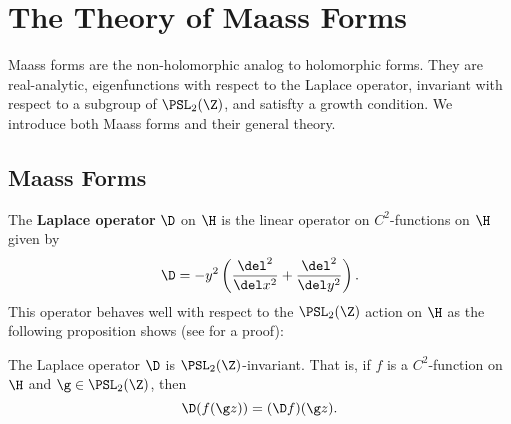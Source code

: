 \chapter{The Theory of Maass Forms}
	Maass forms are the non-holomorphic analog to holomorphic forms. They are real-analytic, eigenfunctions with respect to the Laplace operator, invariant with respect to a subgroup of $\PSL_{2}(\Z)$, and satisfty a growth condition. We introduce both Maass forms and their general theory.
  \section{Maass Forms}
    The \textbf{Laplace operator} $\D$ on $\H$ is the linear operator on $C^{2}$-functions on $\H$ given by
    \[
      \D = -y^{2}\left(\frac{\del^{2}}{\del x^{2}}+\frac{\del^{2}}{\del y^{2}}\right).
    \]
    This operator behaves well with respect to the $\PSL_{2}(\Z)$ action on $\H$ as the following proposition shows (see \cite{motohashi1997spectral} for a proof):

    \begin{proposition}\label{prop:Laplace_is_invariant}
      The Laplace operator $\D$ is $\PSL_{2}(\Z)$-invariant. That is, if $f$ is a $C^{2}$-function on $\H$ and $\g \in \PSL_{2}(\Z)$, then
      \[
        \D(f(\g z)) = (\D f)(\g z).
      \]
    \end{proposition}

